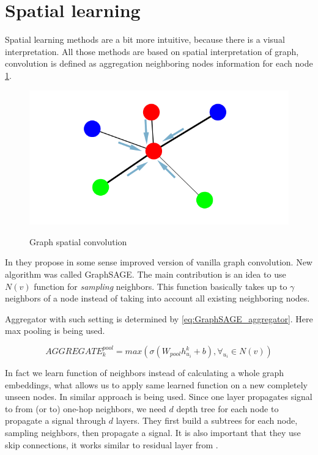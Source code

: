 \section{Spatial learning}

Spatial learning methods are a bit more intuitive, because there is a visual interpretation. All those methods are based on spatial interpretation of graph, convolution is defined as aggregation neighboring nodes information for each node \ref{fig:graph-spatial-convolution}.

\begin{figure}[!h]
    \centering
    \caption{Graph spatial convolution}
    \includegraphics[width=\textwidth]{figure/graph-spatial-convolution.png}
    \label{fig:graph-spatial-convolution}
\end{figure}

In \cite{Hamilton_Ying_Leskovec_2018} they propose in some sense improved version of vanilla graph convolution. New algorithm was called GraphSAGE. The main contribution is an idea to use $N(v)$ function for \textit{sampling} neighbors. This function basically takes up to $\gamma$ neighbors of a node instead of taking into account all existing neighboring nodes.

Aggregator with such setting is determined by \ref{eq:GraphSAGE_aggregator}. Here max pooling is being used.

\begin{equation}
    AGGREGATE^{pool}_k=max({\sigma(W_{pool}h^k_{u_i}+b), \forall_{u_i}\in N(v)})
    \label{eq:GraphSAGE_aggregator}
\end{equation}

In fact we learn function of neighbors instead of calculating a whole graph embeddings, what allows us to apply same learned function on a new completely unseen nodes. In \cite{Gao_Wang_Ji_2018} similar approach is being used. Since one layer propagates signal to from (or to) one-hop neighbors, we need $d$ depth tree for each node to propagate a signal through $d$ layers. They first build a subtrees for each node, sampling neighbors, then propagate a signal. It is also important that they use skip connections, it works similar to residual layer from \cite{He_Zhang_Ren_Sun_2015}.

